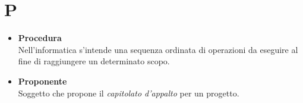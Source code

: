 \chapter{P} \label{P}
	\begin{itemize}
		\item \textbf{Procedura}\\
		Nell'informatica s'intende una sequenza ordinata di operazioni da eseguire al fine di raggiungere un determinato scopo.

		\item \textbf{Proponente}\\
		Soggetto che propone il \textit{capitolato d'appalto} per un progetto.
	\end{itemize}